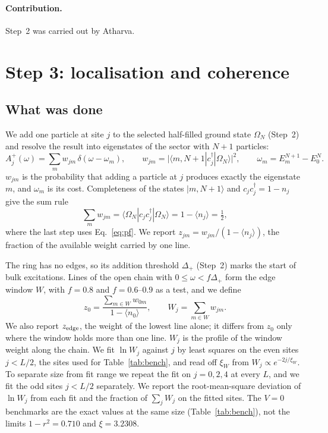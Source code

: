 \documentclass[11pt,a4paper]{article}
\newcommand{\dg}{^{\dagger}}
\begin{document}
\paragraph{Contribution.} Step~2 was carried out by Atharva.

\section{Step 3: localisation and coherence}
\label{sec:step3}

\subsection{What was done}

We add one particle at site $j$ to the selected half-filled ground state $\Omega_N$ (Step~2) and resolve the result into eigenstates of the sector with $N+1$ particles:
\begin{equation}
  A^+_j(\omega)=\sum_m w_{jm}\,\delta(\omega-\omega_m),\qquad
  w_{jm}=\big|\langle m,N+1|c_j\dg|\Omega_N\rangle\big|^2,\qquad
  \omega_m=E^{N+1}_m-E^N_0 .
  \label{eq:addition}
\end{equation}
$w_{jm}$ is the probability that adding a particle at $j$ produces exactly the eigenstate $m$, and $\omega_m$ is its cost.
Completeness of the states $|m,N+1\rangle$ and $c_jc_j\dg=1-n_j$ give the sum rule
\begin{equation}
  \sum_m w_{jm}=\langle\Omega_N|c_jc_j\dg|\Omega_N\rangle=1-\langle n_j\rangle=\tfrac12 ,
  \label{eq:sumrule}
\end{equation}
where the last step uses Eq.~\eqref{eq:pf}.
We report $z_{jm}=w_{jm}/(1-\langle n_j\rangle)$, the fraction of the available weight carried by one line.

The ring has no edges, so its addition threshold $\Delta_+$ (Step~2) marks the start of bulk excitations.
Lines of the open chain with $0\le\omega<f\Delta_+$ form the edge window $W$, with $f=0.8$ and $f=0.6$--$0.9$ as a test, and we define
\begin{equation}
  z_0=\frac{\sum_{m\in W}w_{0m}}{1-\langle n_0\rangle},\qquad
  W_j=\sum_{m\in W}w_{jm}.
  \label{eq:z0}
\end{equation}
We also report $z_{\rm edge}$, the weight of the lowest line alone; it differs from $z_0$ only where the window holds more than one line.
$W_j$ is the profile of the window weight along the chain.
We fit $\ln W_j$ against $j$ by least squares on the even sites $j<L/2$, the sites used for Table~\ref{tab:bench}, and read off $\xi_W$ from $W_j\propto e^{-2j/\xi_W}$.
To separate size from fit range we repeat the fit on $j=0,2,4$ at every $L$, and we fit the odd sites $j<L/2$ separately.
We report the root-mean-square deviation of $\ln W_j$ from each fit and the fraction of $\sum_jW_j$ on the fitted sites.
The $V=0$ benchmarks are the exact values at the same size (Table~\ref{tab:bench}), not the limits $1-r^2=0.710$ and $\xi=3.2308$.
\end{document}
